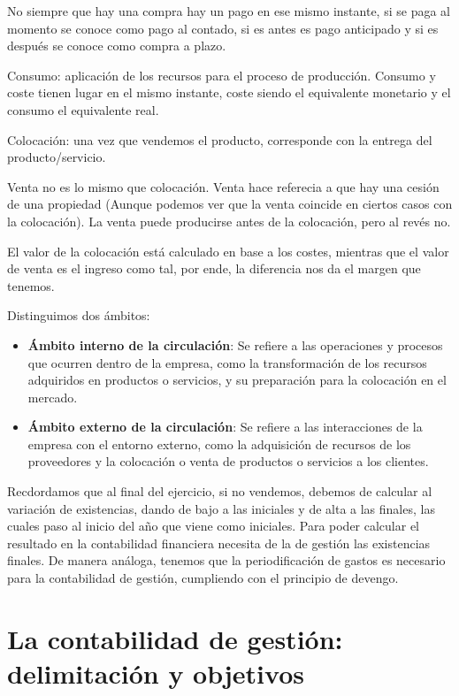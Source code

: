 \documentclass[12pt]{report} %
\begin{document}
No siempre que hay una compra hay un pago en ese mismo instante, si se
paga al momento se conoce como pago al contado, si es antes es pago
anticipado y si es después se conoce como compra a plazo.

Consumo: aplicación de los recursos para el proceso de producción.
Consumo y coste tienen lugar en el mismo instante, coste siendo el
equivalente monetario y el consumo el equivalente real.

Colocación: una vez que vendemos el producto, corresponde con la entrega
del producto/servicio.

Venta no es lo mismo que colocación. Venta hace referecia a que hay una
cesión de una propiedad (Aunque podemos ver que la venta coincide en
ciertos casos con la colocación). La venta puede producirse antes de la
colocación, pero al revés no.

El valor de la colocación está calculado en base a los costes, mientras
que el valor de venta es el ingreso como tal, por ende, la diferencia
nos da el margen que tenemos.

Distinguimos dos ámbitos:

\begin{itemize}
\item
  \textbf{Ámbito interno de la circulación}: Se refiere a las
  operaciones y procesos que ocurren dentro de la empresa, como la
  transformación de los recursos adquiridos en productos o servicios, y
  su preparación para la colocación en el mercado.
\item
  \textbf{Ámbito externo de la circulación}: Se refiere a las
  interacciones de la empresa con el entorno externo, como la
  adquisición de recursos de los proveedores y la colocación o venta de
  productos o servicios a los clientes.
\end{itemize}

Recdordamos que al final del ejercicio, si no vendemos, debemos de
calcular al variación de existencias, dando de bajo a las iniciales y de
alta a las finales, las cuales paso al inicio del año que viene como
iniciales. Para poder calcular el resultado en la contabilidad
financiera necesita de la de gestión las existencias finales. De manera
análoga, tenemos que la periodificación de gastos es necesario para la
contabilidad de gestión, cumpliendo con el principio de devengo.

\hypertarget{la-contabilidad-de-gestiuxf3n-delimitaciuxf3n-y-objetivos}{%
\section{La contabilidad de gestión: delimitación y
objetivos}\label{la-contabilidad-de-gestiuxf3n-delimitaciuxf3n-y-objetivos}}
\end{document}
